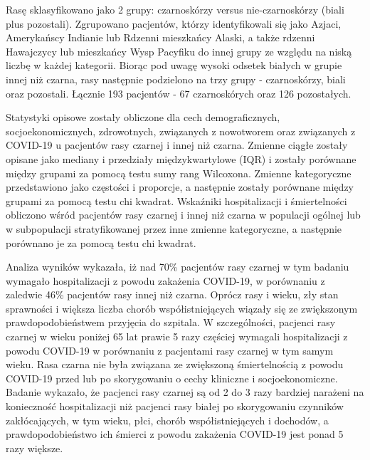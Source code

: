 \documentclass[polish, twoside, 12pt, a4paper]{article}
\theoremstyle{definition}
\theoremstyle{plain}
\theoremstyle{remark}
\begin{document}
Rasę sklasyfikowano jako 2 grupy: czarnoskórzy versus nie-czarnoskórzy (biali plus pozostali). Zgrupowano pacjentów, którzy identyfikowali się jako Azjaci, Amerykańscy Indianie lub Rdzenni mieszkańcy Alaski, a także rdzenni Hawajczycy lub mieszkańcy Wysp Pacyfiku do innej grupy ze względu na niską liczbę w każdej kategorii. Biorąc pod uwagę wysoki odsetek białych w grupie innej niż czarna, rasy następnie podzielono na trzy grupy - czarnoskórzy, biali oraz pozostali. Łącznie 193 pacjentów - 67 czarnoskórych oraz 126 pozostałych.

Statystyki opisowe zostały obliczone dla cech demograficznych, socjoekonomicznych, zdrowotnych, związanych z nowotworem oraz związanych z COVID-19 u pacjentów rasy czarnej i innej niż czarna. Zmienne ciągłe zostały opisane jako mediany i przedziały międzykwartylowe (IQR) i zostały porównane między grupami za pomocą testu sumy rang Wilcoxona. Zmienne kategoryczne przedstawiono jako częstości i proporcje, a następnie zostały porównane między grupami za pomocą testu chi kwadrat. Wskaźniki hospitalizacji i śmiertelności obliczono wśród pacjentów rasy czarnej i innej niż czarna w populacji ogólnej lub w subpopulacji stratyfikowanej przez inne zmienne kategoryczne, a następnie porównano je za pomocą testu chi kwadrat.
	
Analiza wyników wykazała, iż nad 70\% pacjentów rasy czarnej w tym badaniu wymagało hospitalizacji z powodu zakażenia COVID-19, w porównaniu z zaledwie 46\% pacjentów rasy innej niż czarna. Oprócz rasy i wieku, zły stan sprawności i większa liczba chorób współistniejących wiązały się ze zwiększonym prawdopodobieństwem przyjęcia do szpitala. W szczególności, pacjenci rasy czarnej w wieku poniżej 65 lat prawie 5 razy częściej wymagali hospitalizacji z powodu COVID-19 w porównaniu z pacjentami rasy czarnej w tym samym wieku. Rasa czarna nie była związana ze zwiększoną śmiertelnością z powodu COVID-19 przed lub po skorygowaniu o cechy kliniczne i socjoekonomiczne. Badanie wykazało, że pacjenci rasy czarnej są od 2 do 3 razy bardziej narażeni na konieczność hospitalizacji niż pacjenci rasy białej po skorygowaniu czynników zakłócających, w tym wieku, płci, chorób współistniejących i dochodów, a prawdopodobieństwo ich śmierci z powodu zakażenia COVID-19 jest ponad 5 razy większe.

\end{document}
